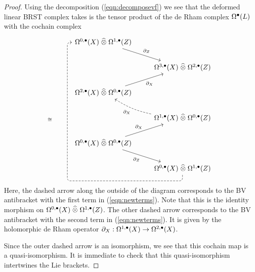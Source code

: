 \documentclass[11pt]{amsart}
\begin{document}
\begin{proof}
Using the decomposition (\ref{eqn:decomposevf}) we see that the deformed linear BRST complex takes is the tensor product of the de Rham complex $\Omega^{\bullet}(L)$ with the cochain complex
\[
  \begin{tikzcd}
  & \Omega^{0,\bu}(X) \; \Hat{\otimes} \; \Omega^{1,\bu}(Z) \ar[dr, "\partial_Z"] \\
  & & \Omega^{3,\bu}(X) \; \Hat{\otimes} \; \Omega^{2,\bu}(Z) \\
 & \Omega^{2,\bu}(X) \; \Hat{\otimes} \; \Omega^{0,\bu}(Z) \ar[ur, "\partial_X"'] & \\
\;_{\cong}  & & \Omega^{1,\bu}(X) \; \Hat{\otimes} \; \Omega^{0,\bu}(Z) \ar[ul, dashed, bend left = 10, "\partial_X"]\\
 & \Omega^{0,\bu}(X) \; \Hat{\otimes} \; \Omega^{0,\bu}(Z) \ar[ur, "\partial_X"] \ar[dr,"\partial_Z"'] \\
  & & \Omega^{0,\bu}(X) \; \Hat{\otimes} \; \Omega^{1,\bu}(Z)
\ar[dashed, rounded corners, to path={ -- ([yshift=-2ex]\tikztostart.south) -| ([xshift=-1.5ex]\tikztotarget.west) -- (\tikztotarget)}, uuuuul]
  \end{tikzcd}
\]
Here, the dashed arrow along the outside of the diagram corresponds to the BV antibracket with the first term in (\ref{eqn:newterms}).
Note that this is the identity morphism on $\Omega^{0,\bullet}(X) \; \widehat{\otimes} \; \Omega^{1,\bullet}(Z)$.
The other dashed arrow corresponds to the BV antibracket with the second term in (\ref{eqn:newterms}).
It is given by the holomorphic de Rham operator $\partial_X : \Omega^{1,\bullet}(X) \to \Omega^{2,\bullet}(X)$.

Since the outer dashed arrow is an isomorphism, we see that this cochain map is a quasi-isomorphism.
It is immediate to check that this quasi-isomorphism intertwines the Lie brackets.


\end{proof}
\end{document}
